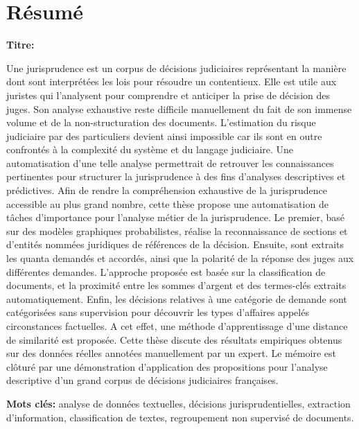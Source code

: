 \chapter*{Résumé}
\textbf{Titre:} \textsc{\titlefr}

Une jurisprudence est un corpus de décisions judiciaires représentant la manière dont sont interprétées les lois pour résoudre un contentieux. Elle est utile aux juristes qui l'analysent pour comprendre et anticiper la prise de décision des juges. Son analyse exhaustive reste difficile manuellement du fait de son immense volume et de la non-structuration des documents. L'estimation du risque judiciaire par des particuliers devient ainsi impossible car ils sont en outre confrontés à la complexité du système et du langage judiciaire. Une automatisation d'une telle analyse permettrait de retrouver les connaissances pertinentes pour structurer la jurisprudence à des fins d'analyses descriptives et prédictives.  
Afin de rendre la compréhension exhaustive de la jurisprudence accessible au plus grand nombre, cette thèse propose une automatisation de tâches d'importance pour l'analyse métier de la jurisprudence. Le premier, basé sur des modèles graphiques probabilistes, réalise la reconnaissance de sections et d'entités nommées juridiques de références de la décision. Ensuite, sont extraits les quanta demandés et accordés, ainsi que la polarité de la réponse des juges aux différentes demandes. L'approche proposée est basée sur la classification de documents, et la proximité entre les sommes d'argent et des termes-clés extraits automatiquement. Enfin, les décisions relatives à une catégorie de demande sont catégorisées sans supervision pour découvrir les types d'affaires appelés circonstances factuelles. A cet effet, une méthode d'apprentissage d'une distance de similarité est proposée.
Cette thèse discute des résultats empiriques obtenus sur des données réelles annotées manuellement par un expert. Le mémoire est clôturé par une démonstration d'application des propositions pour l'analyse descriptive d'un grand corpus de décisions judiciaires françaises.

\textbf{Mots clés:} analyse de données textuelles, décisions jurisprudentielles, extraction d'information, classification de textes, regroupement non supervisé de documents.
